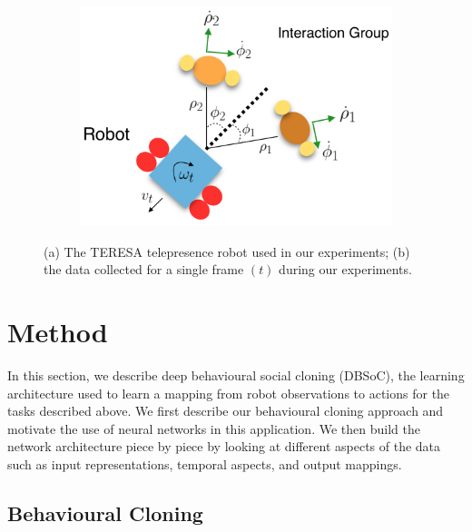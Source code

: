 \documentclass[letterpaper, 10 pt, conference]{ieeeconf}
\begin{document}
\begin{figure}[tbh]
\begin{subfigure}[b]{0.35\columnwidth}
    \caption{}
    \label{fig:robot}
  \end{subfigure}
  \begin{subfigure}[b]{0.35\columnwidth}

    \includegraphics[scale = 0.18]{images/data.png}
  \vspace{5mm}
    \caption{}
       \label{fig:data-pic}
  \end{subfigure} 

  \caption{(a) The TERESA telepresence robot used in our experiments; (b) the data collected for a single frame $(t)$ during our experiments.}

    \vspace{-6mm}
  \label{fig:data_robot}
  \end{figure}

\section{Method}
 In this section, we describe deep behavioural social cloning (DBSoC), the learning architecture used to learn a mapping from robot observations to actions for the tasks described above.  We first describe our behavioural cloning approach and motivate the use of neural networks in this application. We then build the network architecture piece by piece by looking at different aspects of the data such as input representations, temporal aspects, and output mappings. 

\subsection{Behavioural Cloning}
\end{document}
